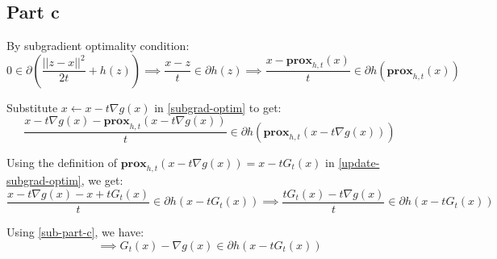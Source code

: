 \documentclass[11pt]{article}
\begin{document}
\subsection*{Part c}
\begin{flushleft}
By subgradient optimality condition:
\begin{equation}
\label{subgrad-optim}
0 \in \partial\left(\frac{||z-x||^2}{2t} + h(z)\right)  \implies \frac{x - z}{t} \in \partial h(z) \implies \frac{x - \textbf{prox}_{h, t}(x)}{t} \in \partial h(\textbf{prox}_{h, t}(x))
\end{equation}

Substitute \(x \leftarrow x - t\nabla g(x)\) in \ref{subgrad-optim} to get:
\begin{equation}
\label{update-subgrad-optim}
\frac{x - t\nabla g(x) - \textbf{prox}_{h, t}(x - t\nabla g(x))}{t} \in \partial h(\textbf{prox}_{h, t}(x - t\nabla g(x)))
\end{equation}

Using the definition of \(\textbf{prox}_{h, t}(x - t\nabla g(x)) = x - tG_{t}(x)\) in \ref{update-subgrad-optim}, we get:
\begin{equation}
\label{sub-part-c}
\frac{x - t\nabla g(x) - x + tG_{t}(x)}{t} \in \partial h(x - tG_{t}(x)) \implies \frac{tG_{t}(x) - t\nabla g(x)}{t} \in \partial h(x - tG_{t}(x)) 
\end{equation}

Using \ref{sub-part-c}, we have:
\begin{equation}
\label{part-c}
\implies G_{t}(x) - \nabla g(x) \in \partial h(x - tG_{t}(x))
\end{equation}
\end{flushleft}
\end{document}
